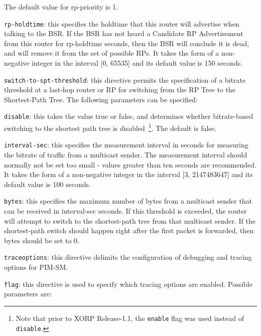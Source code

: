\begin{description}
\begin{description}
\begin{description}
  The default value for {\stt rp-priority} is 1.
\item{\tt rp-holdtime}: this specifies the holdtime that this router
  will advertise when talking to the BSR.  If the BSR has not heard a
  Candidate RP Advertisement from this router for {\stt rp-holdtime}
  seconds, then the BSR will conclude it is dead, and will remove it
  from the set of possible RPs.  It takes the form of a non-negative
  integer in the interval [0, 65535] and its default value is 150 seconds.
\end{description}
\end{description}
\item{\tt switch-to-spt-threshold}: this directive permits the
  specification of a bitrate threshold at a last-hop router or RP
  for switching from the RP Tree to the Shortest-Path Tree.  The
  following parameters can be specified:
\begin{description}
\item{\tt disable}: this takes the value {\stt true} or {\stt false},
  and determines whether bitrate-based switching to the shortest
  path tree is disabled~\footnote{Note
  that prior to XORP Release-1.1, the {\tt enable} flag was used instead of
  {\tt disable}.}.  The default is false.
\item{\tt interval-sec}: this specifies the measurement interval in
  seconds for measuring the bitrate of traffic from a  multicast
  sender.  The measurement interval should normally not be set too
  small - values greater than ten seconds are recommended.
  It takes the form of a non-negative integer in the interval
  [3, 2147483647] and its default value is 100 seconds.
\item{\tt bytes}: this specifies the maximum number of bytes from a
  multicast sender that can be received in {\stt interval-sec}
  seconds.  If this threshold is exceeded, the router will attempt to
  switch to the shortest-path tree from that multicast sender.
  If the shortest-path switch should happen right after the first packet
  is forwarded, then {\stt bytes} should be set to 0.
\end{description}
\item{\tt traceoptions}: this directive delimits the configuration of
  debugging and tracing options for PIM-SM.
\begin{description}
\item{\tt flag}: this directive is used to specify which tracing
  options are enabled.  Possible parameters are:
\begin{description}

\end{description}
\end{description}
\end{description}
